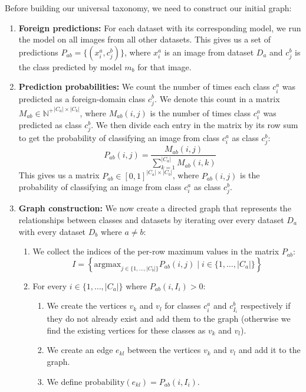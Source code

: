 Before building our universal taxonomy,
we need to construct our initial graph:

\begin{enumerate}
    \item \textbf{Foreign predictions:} For each dataset with its corresponding model,
          we run the model on all images from all other datasets.
          This gives us a set of predictions $P_{ab} = \{(x_i^a, c_j^b)\}$,
          where $x_i^a$ is an image from dataset $D_a$ and $c_j^b$ is the class
          predicted by model $m_b$ for that image.
    \item \textbf{Prediction probabilities:} We count the number of times each class $c_i^a$ was predicted
          as a foreign-domain class $c_j^b$.
          We denote this count in a matrix $M_{ab}\in {\mathbb{N}^+}^{|C_a| \times |C_b|}$,
          where $M_{ab}(i, j)$ is the number of times class $c_i^a$ was predicted
          as class $c_j^b$.
          We then divide each entry in the matrix by its row sum to get the
          probability of classifying an image from class $c_i^a$ as class $c_j^b$:
          \begin{equation*}
              P_{ab}(i, j) = \frac{M_{ab}(i, j)}{\sum_{k=1}^{|C_a|} M_{ab}(i, k)}
          \end{equation*}
          This gives us a matrix $P_{ab}\in [0, 1]^{|C_a| \times |C_b|}$,
          where $P_{ab}(i, j)$ is the probability of classifying an image from class $c_i^a$
          as class $c_j^b$.
    \item \textbf{Graph construction:} We now create a directed graph that represents the relationships between classes and datasets
          by iterating over every dataset $D_a$ with every dataset $D_b$ where $a \neq b$:
          \begin{enumerate}
              \item We collect the indices of the per-row maximum values in the matrix $P_{ab}$:
                    \begin{equation*}
                        I = \left\{\text{argmax}_{j\in\{1,\ldots,|C_b|\}} P_{ab}(i, j) \mid i\in\{1,\ldots,|C_a|\}\right\}
                    \end{equation*}
              \item For every $i\in \{1,\ldots,|C_a|\}$ where $P_{ab}(i, I_i) > 0$:
                    \begin{enumerate}
                        \item We create the vertices $v_k$ and $v_l$ for classes $c_i^a$ and $c_{I_i}^b$ respectively
                              if they do not already exist and add them to the graph
                              (otherwise we find the existing vertices for these classes as $v_k$ and $v_l$).
                        \item We create an edge $e_{kl}$ between the vertices $v_k$ and $v_l$ and add it to the graph.
                        \item We define $\text{probability}(e_{kl}) = P_{ab}(i, I_i)$.
                    \end{enumerate}
          \end{enumerate}
\end{enumerate}

